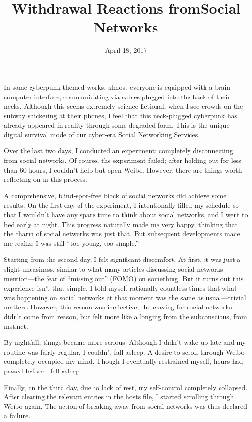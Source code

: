 

\title{Withdrawal Reactions from}
\title{Social Networks}
\date{April 18, 2017}

In some cyberpunk-themed works, almost everyone is equipped with a brain-computer interface, communicating via cables plugged into the back of their necks. Although this seems extremely science-fictional, when I see crowds on the subway snickering at their phones, I feel that this neck-plugged cyberpunk has already appeared in reality through some degraded form. This is the unique digital survival mode of our cyber-era Social Networking Services.

Over the last two days, I conducted an experiment: completely disconnecting from social networks. Of course, the experiment failed; after holding out for less than 60 hours, I couldn't help but open Weibo. However, there are things worth reflecting on in this process.

A comprehensive, blind-spot-free block of social networks did achieve some results. On the first day of the experiment, I intentionally filled my schedule so that I wouldn't have any spare time to think about social networks, and I went to bed early at night. This progress naturally made me very happy, thinking that the charm of social networks was just that. But subsequent developments made me realize I was still ``too young, too simple.''

Starting from the second day, I felt significant discomfort. At first, it was just a slight uneasiness, similar to what many articles discussing social networks mention—the fear of ``missing out'' (FOMO) on something. But it turns out this experience isn't that simple. I told myself rationally countless times that what was happening on social networks at that moment was the same as usual—trivial matters. However, this reason was ineffective; the craving for social networks didn't come from reason, but felt more like a longing from the subconscious, from instinct.

By nightfall, things became more serious. Although I didn't wake up late and my routine was fairly regular, I couldn't fall asleep. A desire to scroll through Weibo completely occupied my mind. Though I eventually restrained myself, hours had passed before I fell asleep.

Finally, on the third day, due to lack of rest, my self-control completely collapsed. After clearing the relevant entries in the hosts file, I started scrolling through Weibo again. The action of breaking away from social networks was thus declared a failure.

